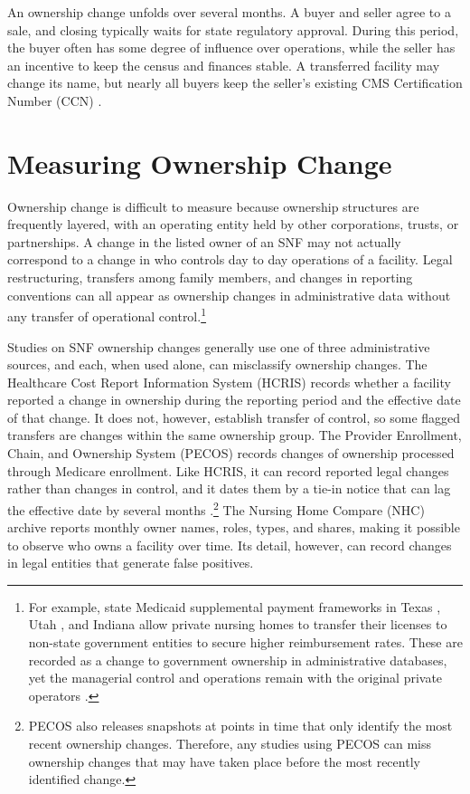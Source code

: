 \documentclass[12pt]{article}
\begin{document}
An ownership change unfolds over several months. A buyer and seller agree to a sale, and closing typically waits for state regulatory approval. During this period, the buyer often has some degree of influence over operations, while the seller has an incentive to keep the census and finances stable. A transferred facility may change its name, but nearly all buyers keep the seller's existing CMS Certification Number (CCN) \citep{CMS2024AppendixPP, eCFR42CFR489.18}.

\section{Measuring Ownership Change} \label{sec:measuring-ownership}

Ownership change is difficult to measure because ownership structures are frequently layered, with an operating entity held by other corporations, trusts, or partnerships. A change in the listed owner of an SNF may not actually correspond to a change in who controls day to day operations of a facility. Legal restructuring, transfers among family members, and changes in reporting conventions can all appear as ownership changes in administrative data without any transfer of operational control.\footnote{For example, state Medicaid supplemental payment frameworks in Texas \citep{tex_admin_code_353_1302}, Utah \citep{utah_admin_code_r414_505_5}, and Indiana \citep{ind_code_12_15_14} allow private nursing homes to transfer their licenses to non-state government entities to secure higher reimbursement rates. These are recorded as a change to government ownership in administrative databases, yet the managerial control and operations remain with the original private operators \citep{utah_auditor_2026_snf_upl, kffhn_2017_indiana_nh, kxan_2021_qipp}.}

Studies on SNF ownership changes generally use one of three administrative sources, and each, when used alone, can misclassify ownership changes. The Healthcare Cost Report Information System (HCRIS) records whether a facility reported a change in ownership during the reporting period and the effective date of that change. It does not, however, establish transfer of control, so some flagged transfers are changes within the same ownership group. The Provider Enrollment, Chain, and Ownership System (PECOS) records changes of ownership processed through Medicare enrollment. Like HCRIS, it can record reported legal changes rather than changes in control, and it dates them by a tie-in notice that can lag the effective date by several months \citep{CMS2022SNFCHOWGuidance}.\footnote{PECOS also releases snapshots at points in time that only identify the most recent ownership changes. Therefore, any studies using PECOS \citep[e.g.,][]{prusynski_et_al_2025, StevensonEtAl2023, OliveiraBlanco2024} can miss ownership changes that may have taken place before the most recently identified change.} The Nursing Home Compare (NHC) archive reports monthly owner names, roles, types, and shares, making it possible to observe who owns a facility over time. Its detail, however, can record changes in legal entities that generate false positives. 
\end{document}
